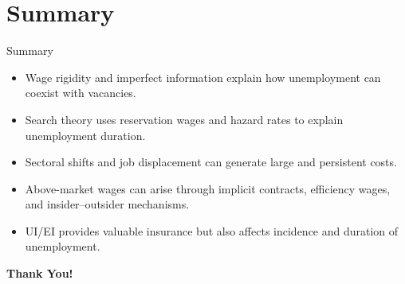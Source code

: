 \documentclass[aspectratio=169]{beamer}
\begin{document}
\section{Summary}

\begin{frame}{Summary}
\transfade
\begin{itemize}[<+->]
  \item Wage rigidity and imperfect information explain how unemployment can coexist with vacancies.
  \item Search theory uses reservation wages and hazard rates to explain unemployment duration.
  \item Sectoral shifts and job displacement can generate large and persistent costs.
  \item Above-market wages can arise through implicit contracts, efficiency wages, and insider--outsider mechanisms.
  \item UI/EI provides valuable insurance but also affects incidence and duration of unemployment.
\end{itemize}


\end{frame}

\begin{frame}
\centering
\Huge{\textbf{Thank You!}}
\end{frame}
\end{document}
